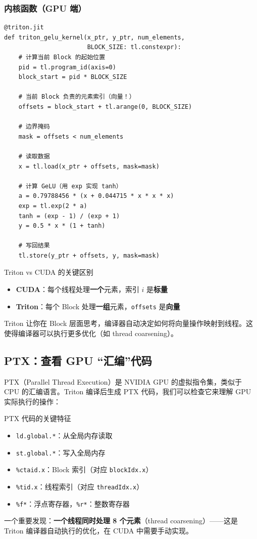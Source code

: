 \subsubsection{内核函数（GPU 端）}

\begin{lstlisting}[caption={Triton GeLU 内核}]
@triton.jit
def triton_gelu_kernel(x_ptr, y_ptr, num_elements,
                       BLOCK_SIZE: tl.constexpr):
    # 计算当前 Block 的起始位置
    pid = tl.program_id(axis=0)
    block_start = pid * BLOCK_SIZE

    # 当前 Block 负责的元素索引（向量！）
    offsets = block_start + tl.arange(0, BLOCK_SIZE)

    # 边界掩码
    mask = offsets < num_elements

    # 读取数据
    x = tl.load(x_ptr + offsets, mask=mask)

    # 计算 GeLU（用 exp 实现 tanh）
    a = 0.79788456 * (x + 0.044715 * x * x * x)
    exp = tl.exp(2 * a)
    tanh = (exp - 1) / (exp + 1)
    y = 0.5 * x * (1 + tanh)

    # 写回结果
    tl.store(y_ptr + offsets, y, mask=mask)
\end{lstlisting}

\begin{importantbox}{Triton vs CUDA 的关键区别}
\begin{itemize}
    \item \textbf{CUDA}：每个线程处理\textbf{一个}元素，索引 $i$ 是\textbf{标量}
    \item \textbf{Triton}：每个 Block 处理\textbf{一组}元素，\texttt{offsets} 是\textbf{向量}
\end{itemize}
Triton 让你在 Block 层面思考，编译器自动决定如何将向量操作映射到线程。这使得编译器可以执行更多优化（如 thread coarsening）。
\end{importantbox}

\subsection{PTX：查看 GPU ``汇编''代码}

PTX（Parallel Thread Execution）是 NVIDIA GPU 的虚拟指令集，类似于 CPU 的汇编语言。Triton 编译后生成 PTX 代码，我们可以检查它来理解 GPU 实际执行的操作：

\begin{knowledgebox}{PTX 代码的关键特征}
\begin{itemize}
    \item \texttt{ld.global.*}：从全局内存读取
    \item \texttt{st.global.*}：写入全局内存
    \item \texttt{\%ctaid.x}：Block 索引（对应 \texttt{blockIdx.x}）
    \item \texttt{\%tid.x}：线程索引（对应 \texttt{threadIdx.x}）
    \item \texttt{\%f*}：浮点寄存器，\texttt{\%r*}：整数寄存器
\end{itemize}
一个重要发现：\textbf{一个线程同时处理 8 个元素}（thread coarsening）——这是 Triton 编译器自动执行的优化，在 CUDA 中需要手动实现。
\end{knowledgebox}

